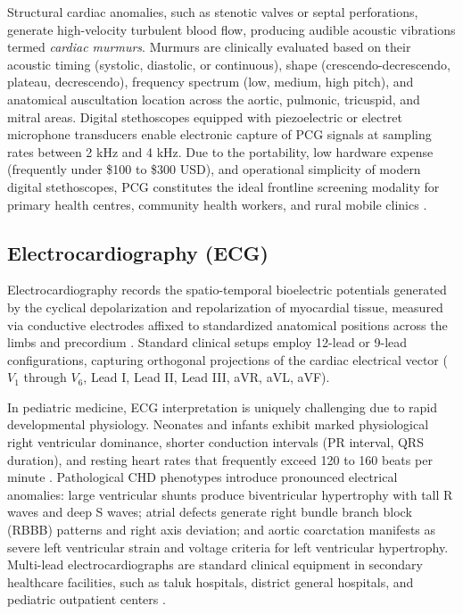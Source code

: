 \documentclass[12pt,a4paper]{amritareport}
\begin{document}
Structural cardiac anomalies, such as stenotic valves or septal perforations, generate high-velocity turbulent blood flow, producing audible acoustic vibrations termed \textit{cardiac murmurs}. Murmurs are clinically evaluated based on their acoustic timing (systolic, diastolic, or continuous), shape (crescendo-decrescendo, plateau, decrescendo), frequency spectrum (low, medium, high pitch), and anatomical auscultation location across the aortic, pulmonic, tricuspid, and mitral areas. Digital stethoscopes equipped with piezoelectric or electret microphone transducers enable electronic capture of PCG signals at sampling rates between 2 kHz and 4 kHz. Due to the portability, low hardware expense (frequently under \$100 to \$300 USD), and operational simplicity of modern digital stethoscopes, PCG constitutes the ideal frontline screening modality for primary health centres, community health workers, and rural mobile clinics \cite{oliveira2022circor}.

\subsection{Electrocardiography (ECG)}
Electrocardiography records the spatio-temporal bioelectric potentials generated by the cyclical depolarization and repolarization of myocardial tissue, measured via conductive electrodes affixed to standardized anatomical positions across the limbs and precordium \cite{kashou2020electrocardiogram}. Standard clinical setups employ 12-lead or 9-lead configurations, capturing orthogonal projections of the cardiac electrical vector ($V_1$ through $V_6$, Lead I, Lead II, Lead III, aVR, aVL, aVF). 

In pediatric medicine, ECG interpretation is uniquely challenging due to rapid developmental physiology. Neonates and infants exhibit marked physiological right ventricular dominance, shorter conduction intervals (PR interval, QRS duration), and resting heart rates that frequently exceed 120 to 160 beats per minute \cite{dicapua2019pediatric}. Pathological CHD phenotypes introduce pronounced electrical anomalies: large ventricular shunts produce biventricular hypertrophy with tall R waves and deep S waves; atrial defects generate right bundle branch block (RBBB) patterns and right axis deviation; and aortic coarctation manifests as severe left ventricular strain and voltage criteria for left ventricular hypertrophy. Multi-lead electrocardiographs are standard clinical equipment in secondary healthcare facilities, such as taluk hospitals, district general hospitals, and pediatric outpatient centers \cite{zheng202012}.
\end{document}
